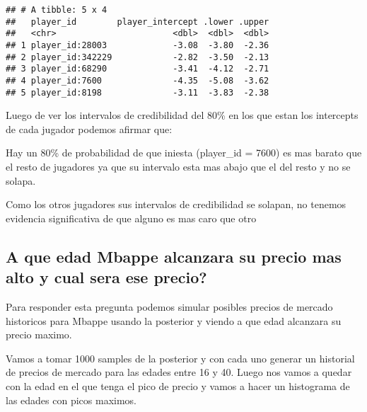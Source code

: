\documentclass[
]{article}
\begin{document}
\begin{verbatim}
## # A tibble: 5 x 4
##   player_id        player_intercept .lower .upper
##   <chr>                       <dbl>  <dbl>  <dbl>
## 1 player_id:28003             -3.08  -3.80  -2.36
## 2 player_id:342229            -2.82  -3.50  -2.13
## 3 player_id:68290             -3.41  -4.12  -2.71
## 4 player_id:7600              -4.35  -5.08  -3.62
## 5 player_id:8198              -3.11  -3.83  -2.38
\end{verbatim}

Luego de ver los intervalos de credibilidad del 80\% en los que estan
los intercepts de cada jugador podemos afirmar que:

Hay un 80\% de probabilidad de que iniesta (player\_id = 7600) es mas
barato que el resto de jugadores ya que su intervalo esta mas abajo que
el del resto y no se solapa.

Como los otros jugadores sus intervalos de credibilidad se solapan, no
tenemos evidencia significativa de que alguno es mas caro que otro

\subsection{A que edad Mbappe alcanzara su precio mas alto y cual sera
ese
precio?}\label{a-que-edad-mbappe-alcanzara-su-precio-mas-alto-y-cual-sera-ese-precio}

Para responder esta pregunta podemos simular posibles precios de mercado
historicos para Mbappe usando la posterior y viendo a que edad alcanzara
su precio maximo.

Vamos a tomar 1000 samples de la posterior y con cada uno generar un
historial de precios de mercado para las edades entre 16 y 40. Luego nos
vamos a quedar con la edad en el que tenga el pico de precio y vamos a
hacer un histograma de las edades con picos maximos.
\end{document}
